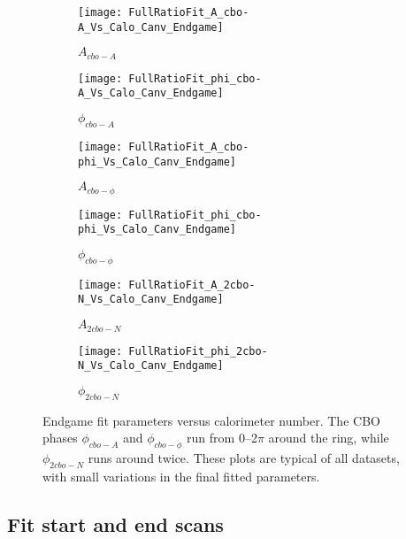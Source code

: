 \begin{figure}
\centering
    \begin{subfigure}[]{0.45\textwidth}
        \centering
        \texttt{[image: FullRatioFit\_A\_cbo-A\_Vs\_Calo\_Canv\_Endgame]}
        \caption{$A_{cbo-A}$}
    \end{subfigure}%
    \begin{subfigure}[]{0.45\textwidth}
        \centering
        \texttt{[image: FullRatioFit\_phi\_cbo-A\_Vs\_Calo\_Canv\_Endgame]}
        \caption{$\phi_{cbo-A}$}
    \end{subfigure}

    \begin{subfigure}[]{0.45\textwidth}
        \centering
        \texttt{[image: FullRatioFit\_A\_cbo-phi\_Vs\_Calo\_Canv\_Endgame]}
        \caption{$A_{cbo-\phi}$}
    \end{subfigure}%
    \begin{subfigure}[]{0.45\textwidth}
        \centering
        \texttt{[image: FullRatioFit\_phi\_cbo-phi\_Vs\_Calo\_Canv\_Endgame]}
        \caption{$\phi_{cbo-\phi}$}
    \end{subfigure}

    \begin{subfigure}[]{0.45\textwidth}
        \centering
        \texttt{[image: FullRatioFit\_A\_2cbo-N\_Vs\_Calo\_Canv\_Endgame]}
        \caption{$A_{2cbo-N}$}
    \end{subfigure}%
    \begin{subfigure}[]{0.45\textwidth}
        \centering
        \texttt{[image: FullRatioFit\_phi\_2cbo-N\_Vs\_Calo\_Canv\_Endgame]}
        \caption{$\phi_{2cbo-N}$}
    \end{subfigure}
\caption[Endgame fit parameters versus calorimeter number]{Endgame fit parameters versus calorimeter number. The CBO phases $\phi_{cbo-A}$ and $\phi_{cbo-\phi}$ run from 0--2$\pi$ around the ring, while $\phi_{2cbo-N}$ runs around twice. These plots are typical of all datasets, with small variations in the final fitted parameters.}
\label{fig:fig:caloFits_EndgamePars_2}
\end{figure}


\clearpage

\subsection{Fit start and end scans}


